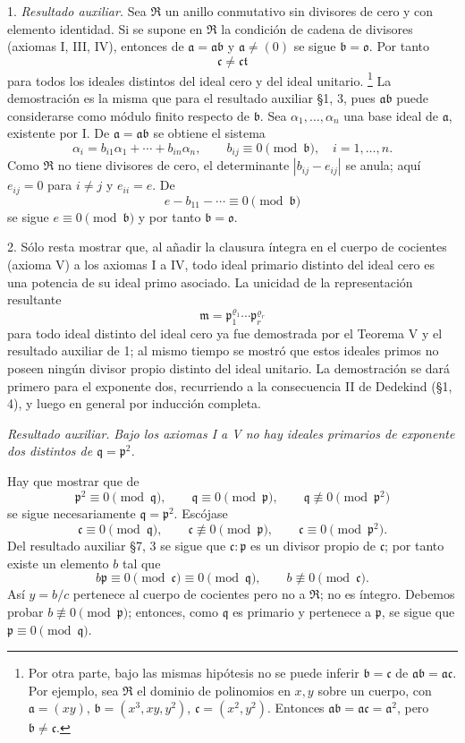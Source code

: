 \documentclass[11pt]{article}
\providecommand{\mR}{\mathfrak{R}}
\providecommand{\ma}{\mathfrak{a}}
\providecommand{\mb}{\mathfrak{b}}
\providecommand{\mc}{\mathfrak{c}}
\providecommand{\mm}{\mathfrak{m}}
\providecommand{\mo}{\mathfrak{o}}
\providecommand{\mpideal}{\mathfrak{p}}
\providecommand{\mq}{\mathfrak{q}}
\providecommand{\mt}{\mathfrak{t}}
\begin{document}
1. \emph{Resultado auxiliar.} Sea $\mR$ un anillo conmutativo sin divisores de cero y con elemento identidad. Si se supone en $\mR$ la condición de cadena de divisores (axiomas I, III, IV), entonces de $\ma=\ma\mb$ y $\ma\ne(0)$ se sigue $\mb=\mo$. Por tanto
\[
        \mc\ne\mc\mt
\]
para todos los ideales distintos del ideal cero y del ideal unitario.
\footnote{Por otra parte, bajo las mismas hipótesis no se puede inferir $\mb=\mc$ de $\ma\mb=\ma\mc$. Por ejemplo, sea $\mR$ el dominio de polinomios en $x,y$ sobre un cuerpo, con $\ma=(xy)$, $\mb=(x^3,xy,y^2)$, $\mc=(x^2,y^2)$. Entonces $\ma\mb=\ma\mc=\ma^2$, pero $\mb\ne\mc$.}
La demostración es la misma que para el resultado auxiliar §1, 3, pues $\ma\mb$ puede considerarse como módulo finito respecto de $\mb$. Sea $\alpha_1,\ldots,\alpha_n$ una base ideal de $\ma$, existente por I. De $\ma=\ma\mb$ se obtiene el sistema
\[
        \alpha_i=b_{i1}\alpha_1+\cdots+b_{in}\alpha_n,
        \qquad b_{ij}\equiv0\pmod{\mb},\quad i=1,\ldots,n .
\]
Como $\mR$ no tiene divisores de cero, el determinante $|b_{ij}-e_{ij}|$ se anula; aquí $e_{ij}=0$ para $i\ne j$ y $e_{ii}=e$. De
\[
        e-b_{11}-\cdots\equiv0\pmod{\mb}
\]
se sigue $e\equiv0\pmod{\mb}$ y por tanto $\mb=\mo$.

2. Sólo resta mostrar que, al añadir la clausura íntegra en el cuerpo de cocientes (axioma V) a los axiomas I a IV, todo ideal primario distinto del ideal cero es una potencia de su ideal primo asociado. La unicidad de la representación resultante
\[
        \mm=\mpideal_1^{\varrho_1}\cdots\mpideal_r^{\varrho_r}
\]
para todo ideal distinto del ideal cero ya fue demostrada por el Teorema V y el resultado auxiliar de 1; al mismo tiempo se mostró que estos ideales primos no poseen ningún divisor propio distinto del ideal unitario. La demostración se dará primero para el exponente dos, recurriendo a la consecuencia II de Dedekind (§1, 4), y luego en general por inducción completa.

\emph{Resultado auxiliar.} \emph{Bajo los axiomas I a V no hay ideales primarios de exponente dos distintos de $\mq=\mpideal^2$.}

Hay que mostrar que de
\[
        \mpideal^2\equiv0\pmod{\mq},
        \qquad \mq\equiv0\pmod{\mpideal},
        \qquad \mq\not\equiv0\pmod{\mpideal^2}
\]
se sigue necesariamente $\mq=\mpideal^2$. Escójase
\[
        \mc\equiv0\pmod{\mq},
        \qquad \mc\not\equiv0\pmod{\mpideal},
        \qquad \mc\equiv0\pmod{\mpideal^2}.
\]
Del resultado auxiliar §7, 3 se sigue que $\mc:\mpideal$ es un divisor propio de $\mc$; por tanto existe un elemento $b$ tal que
\[
        b\mpideal\equiv0\pmod{\mc}\equiv0\pmod{\mq},
        \qquad b\not\equiv0\pmod{\mc}.
\]
Así $y=b/c$ pertenece al cuerpo de cocientes pero no a $\mR$; no es íntegro. Debemos probar $b\not\equiv0\pmod{\mpideal}$; entonces, como $\mq$ es primario y pertenece a $\mpideal$, se sigue que $\mpideal\equiv0\pmod{\mq}$.
\end{document}
